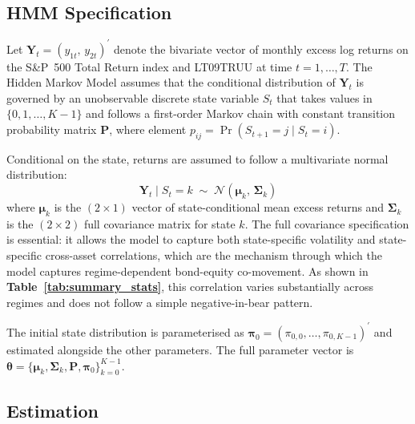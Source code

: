 \documentclass[12pt, a4paper]{article}
\begin{document}
\subsection{HMM Specification}

Let $\mathbf{Y}_t = (y_{1t},\, y_{2t})^{\prime}$ denote the bivariate vector of monthly
excess log returns on the S\&P~500 Total Return index and LT09TRUU at time
$t = 1,\ldots,T$. The Hidden Markov Model assumes that the conditional distribution of
$\mathbf{Y}_t$ is governed by an unobservable discrete state variable $S_t$ that takes
values in $\{0,1,\ldots,K-1\}$ and follows a first-order Markov chain with constant
transition probability matrix $\mathbf{P}$, where element
$p_{ij} = \Pr(S_{t+1}=j \mid S_t=i)$.

Conditional on the state, returns are assumed to follow a multivariate normal distribution:
\begin{equation}
  \mathbf{Y}_t \mid S_t = k \;\sim\; \mathcal{N}\!\left(\boldsymbol{\mu}_k,\,
  \boldsymbol{\Sigma}_k\right)
  \label{eq:hmm_emission}
\end{equation}
where $\boldsymbol{\mu}_k$ is the $(2\times 1)$ vector of state-conditional mean excess
returns and $\boldsymbol{\Sigma}_k$ is the $(2\times 2)$ full covariance matrix for state
$k$. The full covariance specification is essential: it allows the model to capture both
state-specific volatility and state-specific cross-asset correlations, which are the
mechanism through which the model captures regime-dependent bond-equity co-movement.
As shown in \textbf{Table~\ref{tab:summary_stats}}, this correlation varies substantially
across regimes and does not follow a simple negative-in-bear pattern.

The initial state distribution is parameterised as
$\boldsymbol{\pi}_0 = (\pi_{0,0},\ldots,\pi_{0,K-1})^{\prime}$ and estimated alongside the
other parameters. The full parameter vector is
$\boldsymbol{\theta} = \{\boldsymbol{\mu}_k, \boldsymbol{\Sigma}_k, \mathbf{P},
\boldsymbol{\pi}_0\}_{k=0}^{K-1}$.

\subsection{Estimation}
\end{document}
